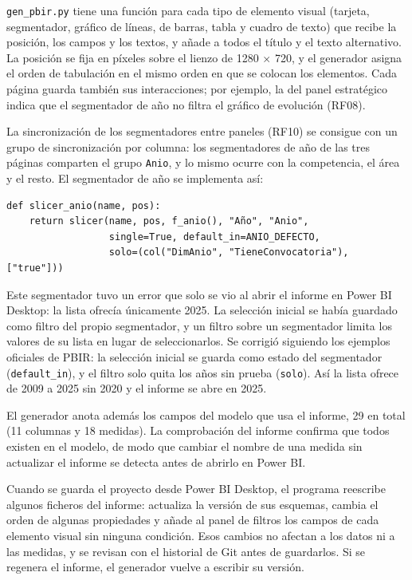 \documentclass[12pt, a4paper, oneside]{report}
\begin{document}
\texttt{gen\_pbir.py} tiene una función para cada tipo de elemento visual (tarjeta, segmentador, gráfico de líneas, de barras, tabla y cuadro de texto) que recibe la posición, los campos y los textos, y añade a todos el título y el texto alternativo. La posición se fija en píxeles sobre el lienzo de 1280 $\times$ 720, y el generador asigna el orden de tabulación en el mismo orden en que se colocan los elementos. Cada página guarda también sus interacciones; por ejemplo, la del panel estratégico indica que el segmentador de año no filtra el gráfico de evolución (RF08).

La sincronización de los segmentadores entre paneles (RF10) se consigue con un grupo de sincronización por columna: los segmentadores de año de las tres páginas comparten el grupo \texttt{Anio}, y lo mismo ocurre con la competencia, el área y el resto. El segmentador de año se implementa así:

\par\vspace{2ex}\noindent\begin{minipage}{\textwidth}\small{}
\begin{verbatim}
def slicer_anio(name, pos):
    return slicer(name, pos, f_anio(), "Año", "Anio",
                  single=True, default_in=ANIO_DEFECTO,
                  solo=(col("DimAnio", "TieneConvocatoria"), ["true"]))
\end{verbatim}
\end{minipage}\par\vspace{2.5ex}

Este segmentador tuvo un error que solo se vio al abrir el informe en Power BI Desktop: la lista ofrecía únicamente 2025. La selección inicial se había guardado como filtro del propio segmentador, y un filtro sobre un segmentador limita los valores de su lista en lugar de seleccionarlos. Se corrigió siguiendo los ejemplos oficiales de PBIR: la selección inicial se guarda como estado del segmentador (\texttt{default\_in}), y el filtro solo quita los años sin prueba (\texttt{solo}). Así la lista ofrece de 2009 a 2025 sin 2020 y el informe se abre en 2025.

El generador anota además los campos del modelo que usa el informe, 29 en total (11 columnas y 18 medidas). La comprobación del informe confirma que todos existen en el modelo, de modo que cambiar el nombre de una medida sin actualizar el informe se detecta antes de abrirlo en Power BI.

Cuando se guarda el proyecto desde Power BI Desktop, el programa reescribe algunos ficheros del informe: actualiza la versión de sus esquemas, cambia el orden de algunas propiedades y añade al panel de filtros los campos de cada elemento visual sin ninguna condición. Esos cambios no afectan a los datos ni a las medidas, y se revisan con el historial de Git antes de guardarlos. Si se regenera el informe, el generador vuelve a escribir su versión.
\end{document}
